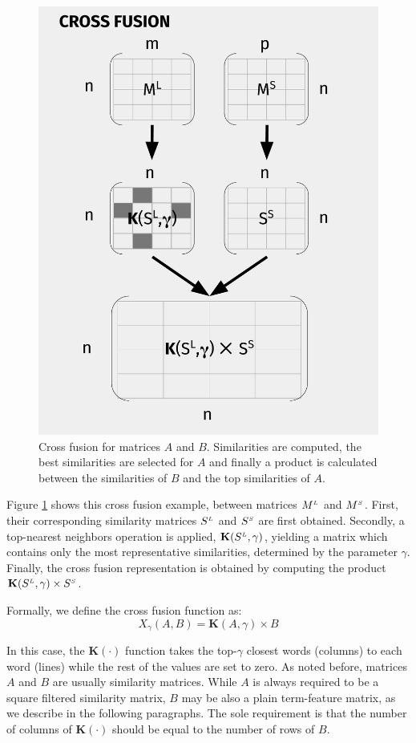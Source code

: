 \begin{figure}
\centering
\includegraphics[width=0.6\linewidth]{images/Chapitre3/xf_diag.pdf}
\caption{Cross fusion for matrices $A$ and $B$. Similarities are computed, the best similarities are selected for $A$ and finally a product is calculated between the similarities of $B$ and the top similarities of $A$.}
\label{fig:xf_diag}
\end{figure}

Figure \ref{fig:xf_diag} shows this cross fusion example, between matrices $M^{\scriptscriptstyle L}$ and $M^{\scriptscriptstyle S}$. First, their corresponding similarity matrices $S^{\scriptscriptstyle L}$ and $S^{\scriptscriptstyle S}$ are first obtained. Secondly, a  top-nearest neighbors operation is applied, $\mathbf{K}(S^{\scriptscriptstyle L}, \gamma)$, yielding a matrix which contains only the most representative similarities, determined by the parameter $\gamma$. Finally, the cross fusion representation is obtained by computing the product $\mathbf{K}(S^{\scriptscriptstyle L}, \gamma) \times S^{\scriptscriptstyle S}$.

Formally, we define the cross fusion function as:
\begin{equation}\label{eq:xfusion}
X_{\gamma}(A,B) = \mathbf{K}(A,\gamma) \times B
\end{equation}

In this case, the $\mathbf{K}(\cdot)$ function takes the top-$\gamma$ closest words (columns) to each word (lines) while the rest of the values are set to zero. As noted before, matrices $A$ and $B$ are usually similarity matrices. While $A$ is always required to be a square filtered similarity matrix, $B$ may be also a plain term-feature matrix, as we describe in the following paragraphs.
The sole requirement is that the number of columns of $\mathbf{K}(\cdot)$ should be equal to the number of rows of $B$.

